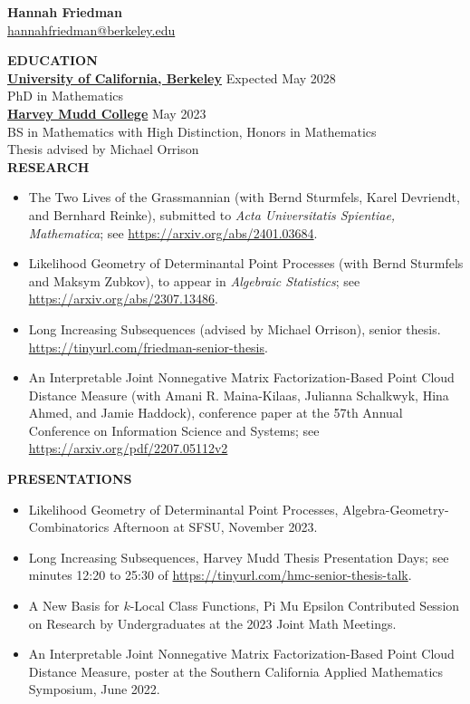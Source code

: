 \documentclass[11pt]{article}
\newcommand{\hdr}[1]{\textcolor{blue(ryb)}{\textbf{#1}}}
\begin{document}
\begin{center}
\hdr{\Large{Hannah Friedman}}\\
\url{hannahfriedman@berkeley.edu}\\
\end{center}
\medskip
\raggedright
\hdr{EDUCATION}\\
\textbf{\underline{University of California, Berkeley}} \hfill Expected May 2028\\
PhD in Mathematics\\
\textbf{\underline{Harvey Mudd College}} \hfill May 2023\\
BS in Mathematics with High Distinction, Honors in Mathematics\\
Thesis advised by Michael Orrison\\
\medskip
\hdr{RESEARCH}\\
\begin{itemize}
\item The Two Lives of the Grassmannian (with Bernd Sturmfels, Karel Devriendt, and Bernhard Reinke), submitted to \textit{Acta Universitatis Spientiae, Mathematica}; see  \url{https://arxiv.org/abs/2401.03684}.
\item Likelihood Geometry of Determinantal Point Processes (with Bernd Sturmfels and Maksym Zubkov), to appear in \emph{Algebraic Statistics}; see  \url{https://arxiv.org/abs/2307.13486}.
\item Long Increasing Subsequences (advised by Michael Orrison), senior thesis.  \url{https://tinyurl.com/friedman-senior-thesis}.
\item An Interpretable Joint Nonnegative Matrix Factorization-Based Point Cloud Distance Measure (with Amani R. Maina-Kilaas, Julianna Schalkwyk, Hina Ahmed, and Jamie Haddock), conference paper at the 57th Annual Conference on Information Science and Systems; see \url{https://arxiv.org/pdf/2207.05112v2}
\end{itemize}
\hdr{PRESENTATIONS}\\
\begin{itemize}
\item Likelihood Geometry of Determinantal Point Processes, Algebra-Geometry-Combinatorics Afternoon at SFSU, November 2023.
\item Long Increasing Subsequences, Harvey Mudd Thesis Presentation Days; see minutes 12:20 to 25:30 of \url{https://tinyurl.com/hmc-senior-thesis-talk}.
\item A New Basis for $k$-Local Class Functions, Pi Mu Epsilon Contributed Session on Research by Undergraduates at the 2023 Joint Math Meetings.
\item An Interpretable Joint Nonnegative Matrix Factorization-Based Point Cloud Distance Measure, poster at the Southern California Applied Mathematics Symposium, June 2022.
\end{itemize}
\end{document}
